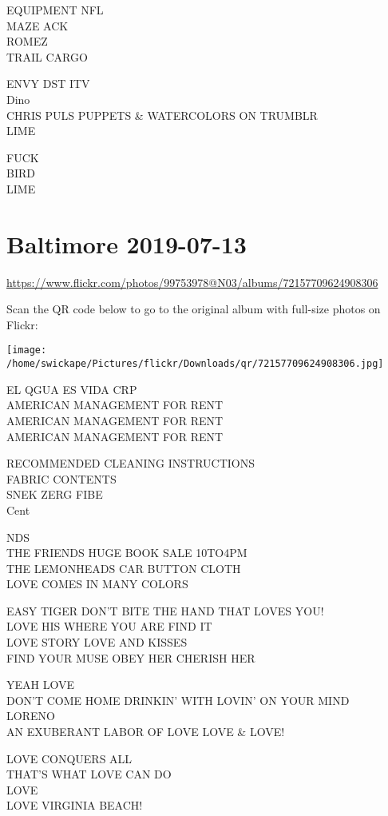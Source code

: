 \documentclass[10pt,letterpaper]{article}
\begin{document}
EQUIPMENT NFL\\
MAZE ACK\\
ROMEZ\\
TRAIL CARGO

ENVY DST ITV\\
Dino\\
CHRIS PULS PUPPETS \& WATERCOLORS ON TRUMBLR\\
LIME

FUCK\\
BIRD\\
LIME


\section*{Baltimore 2019-07-13}

\url{https://www.flickr.com/photos/99753978@N03/albums/72157709624908306}

Scan the QR code below to go to the original album with full-size photos on Flickr:

\texttt{[image: /home/swickape/Pictures/flickr/Downloads/qr/72157709624908306.jpg]}


EL QGUA ES VIDA CRP\\
AMERICAN MANAGEMENT FOR RENT\\
AMERICAN MANAGEMENT FOR RENT\\
AMERICAN MANAGEMENT FOR RENT

RECOMMENDED CLEANING INSTRUCTIONS\\
FABRIC CONTENTS\\
SNEK ZERG FIBE\\
Cent

NDS\\
THE FRIENDS HUGE BOOK SALE 10TO4PM\\
THE LEMONHEADS CAR BUTTON CLOTH\\
LOVE COMES IN MANY COLORS

EASY TIGER DON'T BITE THE HAND THAT LOVES YOU!\\
LOVE HIS WHERE YOU ARE FIND IT\\
LOVE STORY LOVE AND KISSES\\
FIND YOUR MUSE OBEY HER CHERISH HER

YEAH LOVE\\
DON'T COME HOME DRINKIN' WITH LOVIN' ON YOUR MIND\\
LORENO\\
AN EXUBERANT LABOR OF LOVE LOVE \& LOVE!

LOVE CONQUERS ALL\\
THAT'S WHAT LOVE CAN DO\\
LOVE\\
LOVE VIRGINIA BEACH!
\end{document}
